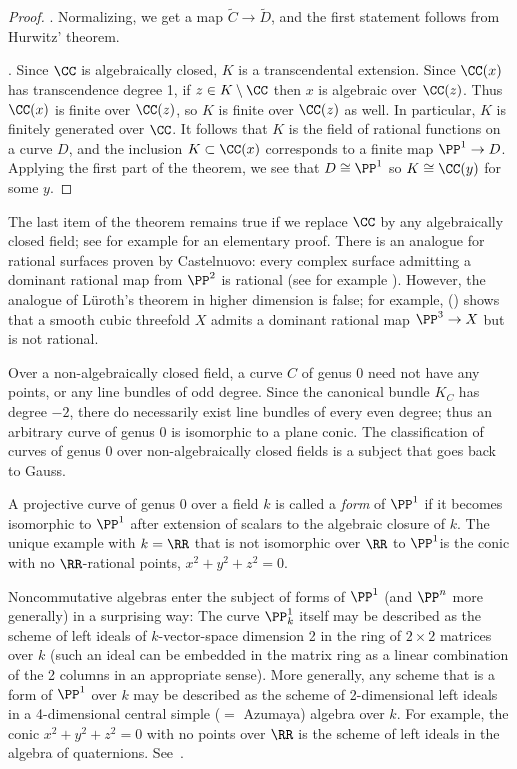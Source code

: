 \begin{proof}
. Normalizing, we get a map  $ \tilde C \to \tilde D$, and the first statement follows from Hurwitz' theorem.

\medbreak

. Since $\CC$ is algebraically closed, $K$ is a transcendental extension. Since $\CC(x)$ has
transcendence degree 1, if $z\in K\setminus \CC$
then $x$ is algebraic over $\CC(z)$. Thus $\CC(x)$ is finite over $\CC(z)$, so $K$ is finite over $\CC(z)$
as well. In particular, $K$ is finitely generated over $\CC$. It follows that $K$ is the field of rational functions
on a curve $D$, and the inclusion $K\subset \CC(x)$ corresponds to a finite map $\PP^1\to D$. Applying
the first part of the theorem, we see that $D\cong \PP^1$ so $K \cong \CC(y)$ for some $y$.
\end{proof}
 
\begin{fact}
The last item of the theorem remains true if we replace $\CC$ by any algebraically closed field; see for example \cite[Section 8.13]{JacobsonII} for an elementary proof.
There is an analogue for rational surfaces proven by Castelnuovo: every complex surface admitting a dominant rational
map from $\PP^2$ is rational (see for example \cite[Corollary V.5]{Beauville}). However, the analogue of L\"uroth's theorem in higher dimension is false; for example, (\cite{MR0302652}) shows that a smooth cubic threefold $X$ admits a dominant rational map $\PP^3 \to X$ but is not rational.
\end{fact}

\begin{fact}
Over a non-algebraically closed field, a curve $C$ of genus 0 need not have any points, or any line bundles of odd degree. Since the canonical bundle $K_C$ has degree $-2$, there do necessarily exist line bundles of every even degree; thus an arbitrary curve of genus 0 is isomorphic to a  plane conic. 
The classification of curves of genus 0 over non-algebraically closed fields is a subject that goes back to Gauss.

A projective curve of genus 0 over a field $k$ is called a \emph{form} of $\PP^1$ if it becomes isomorphic to $\PP^1$ after extension
of scalars to
the algebraic closure of $k$. The unique example with $k = \RR$ that is not isomorphic over $\RR$ to $\PP^1$is the conic with no $\RR$-rational points, $x^2+y^2+z^2 = 0$. 

Noncommutative algebras enter the subject of forms of $\PP^1$ (and $\PP^n$ more generally) in a surprising way: The curve $\PP_k^1$ itself may be described as the scheme of left ideals of $k$-vector-space dimension 2 in the ring of
$2\times 2$ matrices over $k$ (such an ideal can be embedded in the matrix ring as a linear combination of the 2 columns in an appropriate sense). More generally, any scheme that is a form of $\PP^1$ over $k$
may be described as the scheme of 2-dimensional left ideals in a 4-dimensional central simple ($=$ Azumaya) algebra over $k$. For example, the
conic $x^2+y^2+z^2 = 0$ with no points over $\RR$ is the scheme of left ideals in the algebra of quaternions. See~\cite[Section X.6]{Serre1979}.
\end{fact}

